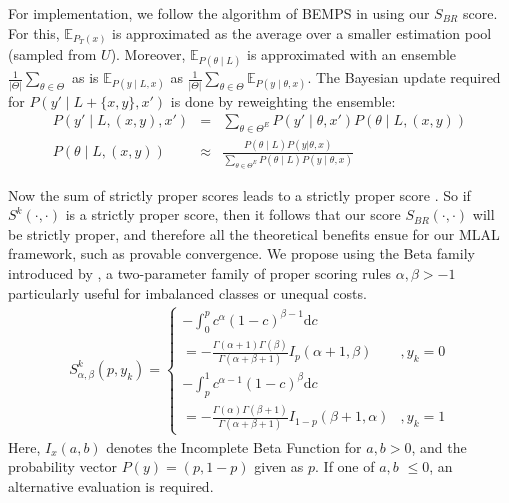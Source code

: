 \documentclass[letterpaper]{article} %
\begin{document}
For implementation, we follow the algorithm of BEMPS in  \cite{TanDuBun-IEEEPAMI23} using our $S_{BR}$ score.
For this,
$\mathbb{E}_{P_T(x)}$ is approximated as the average over a smaller estimation pool (sampled from $U$). Moreover, $\mathbb{E}_{ P(\theta \mid L) }$ is approximated with an ensemble $\frac{1}{|\Theta|}\sum_{\theta\in\Theta} $
 as is 
$\mathbb{E}_{ P(y \mid L,x) }$ as
$\frac{1}{|\Theta|}\sum_{\theta\in\Theta} \mathbb{E}_{ P(y \mid \theta,x) }$.  The Bayesian update required for $P(y' \mid L+\{x,y\},x')$ is done by reweighting the ensemble:
{\scriptsize
\begin{eqnarray}
    P(y' \mid L, (x, y), x') &=& \sum_{\theta\in\Theta^E} P(y' \mid \theta, x') P(\theta \mid L, (x, y))
    \label{eq-3}\\
P(\theta \mid L, (x, y)) & \approx&
\frac{P(\theta \mid L) P(y|\theta,x)}
    {\sum_{\theta\in\Theta^E} P(\theta\mid L) P(y \mid \theta,x)} \label{eq-4}
\end{eqnarray} }

Now the sum of strictly proper scores leads to a strictly proper score \cite{dawid2014theory}.  So if $S^k(\cdot,\cdot)$ is a strictly proper score, then it follows that our  score $S_{BR}(\cdot,\cdot)$ will be strictly proper, and therefore all the theoretical benefits ensue for our MLAL framework, such as provable convergence.
We propose using the Beta family introduced by \cite{Buja2005Loss}, a two-parameter family of proper scoring rules
$\alpha,\beta > -1$ particularly useful for imbalanced classes or unequal costs.
{\scriptsize
\begin{eqnarray} 
\label{eq-Sbeta}
S^k_{\alpha,\beta}(p,y_k) = \left\{
  \begin{array}{lr}
    - \int_0^p c^\alpha (1-c)^{\beta-1} \mbox{d}c  \\ =
         - \frac{\Gamma(\alpha+1)\Gamma(\beta)}{\Gamma(\alpha+\beta+1)} I_p(\alpha+1,\beta)
          & , y_k=0\\
    - \int_p^1 c^{\alpha-1} (1-c)^{\beta} \mbox{d}c \\ 
    =
         - \frac{\Gamma(\alpha)\Gamma(\beta+1)}{\Gamma(\alpha+\beta+1)} I_{1-p}(\beta+1,\alpha) & ,y_k=1
\end{array} \right.
\end{eqnarray}}
\noindent
Here, $I_x(a,b)$ denotes the Incomplete Beta Function for $a,b>0$, 
and the probability vector $P(y)=(p, 1-p)$ given as $p$. 
If one of $a,b$ $\le 0$, an alternative evaluation is required. 
\end{document}
